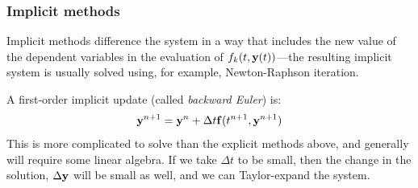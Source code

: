 \subsubsection{Implicit methods}

Implicit methods difference the system in a way that includes the new
value of the dependent variables in the evaluation of $f_k(t,{\bf
  y}(t))$---the resulting implicit system is usually solved using, for
example, Newton-Raphson iteration.

A first-order implicit update
(called {\em backward Euler}) is:
\begin{equation}
  \label{eq:backwardeuler}
{\bf y}^{n+1} = {\bf y}^n + \Delta t {\bf f}(t^{n+1}, {\bf y}^{n+1})
\end{equation}
This is more complicated to solve than the explicit methods above, and
generally will require some linear algebra.  If we take $\Delta t$ to
be small, then the change in the solution, $\Delta {\bf y}$ will be
small as well, and we can Taylor-expand the system.

